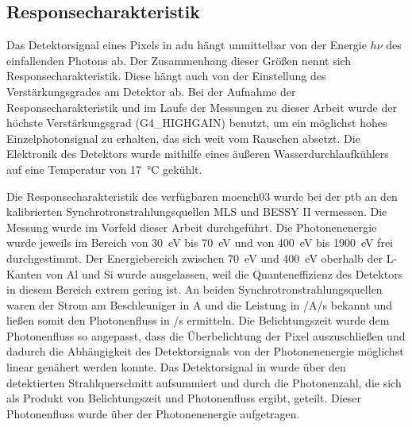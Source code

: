 \subsection{Responsecharakteristik}
Das Detektorsignal eines Pixels in \gls{adu} hängt unmittelbar von der Energie $h\nu$ des einfallenden Photons ab. Der Zusammenhang dieser Größen nennt sich Responsecharakteristik. Diese hängt auch von der Einstellung des Verstärkungsgrades am Detektor ab. Bei der Aufnahme der Responsecharakteristik und im Laufe der Messungen zu dieser Arbeit wurde der höchste Verstärkungsgrad (G4\_HIGHGAIN) benutzt, um ein möglichst hohes Einzelphotonsignal zu erhalten, das sich weit vom Rauschen absetzt. Die Elektronik des Detektors wurde mithilfe eines äußeren Wasserdurchlaufkühlers auf eine Temperatur von \SI{17}{\celsius} gekühlt. 
%     

\noindent
Die Responsecharakteristik des verfügbaren \gls{moench03} wurde bei der \gls{ptb} an den kalibrierten Synchrotronstrahlungsquellen MLS und BESSY II vermessen. Die Messung wurde im Vorfeld dieser Arbeit durchgeführt. Die Photonenenergie wurde jeweils im Bereich von \SI{30}{\eV} bis \SI{70}{\eV} und von \SI{400}{\eV} bis \SI{1900}{\eV} frei durchgestimmt. Der Energiebereich zwischen \SI{70}{\eV} und \SI{400}{\eV} oberhalb der L-Kanten von Al und Si wurde ausgelassen, weil die Quanteneffizienz des Detektors in diesem Bereich extrem gering ist. An beiden Synchrotronstrahlungsquellen waren der Strom am Beschleuniger in \si{\ampere} und die Leistung in \si[per-mode = symbol]{\photons\per\ampere\per\second} bekannt und ließen somit den Photonenfluss in \si[per-mode = symbol]{\photons\per\second} ermitteln. Die Belichtungszeit wurde dem Photonenfluss so angepasst, dass die Überbelichtung der Pixel auszuschließen und dadurch die Abhängigkeit des Detektorsignals von der Photonenenergie möglichst linear genähert werden konnte. Das Detektorsignal in \si{\adu} wurde über den detektierten Strahlquerschnitt aufsummiert und durch die Photonenzahl, die sich als Produkt von Belichtungszeit und Photonenfluss ergibt, geteilt. Dieser Photonenfluss wurde über der Photonenenergie aufgetragen.

